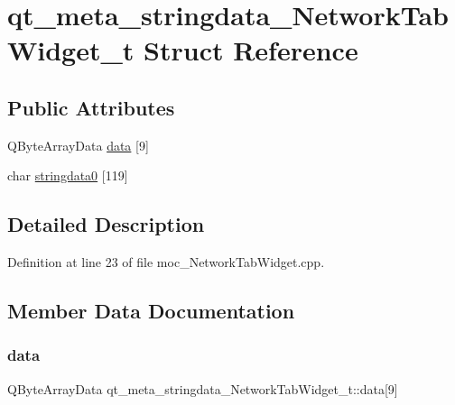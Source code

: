 \hypertarget{structqt__meta__stringdata___network_tab_widget__t}{}\section{qt\+\_\+meta\+\_\+stringdata\+\_\+\+Network\+Tab\+Widget\+\_\+t Struct Reference}
\label{structqt__meta__stringdata___network_tab_widget__t}
\subsection*{Public Attributes}
\begin{DoxyCompactItemize}
\item 
Q\+Byte\+Array\+Data \hyperlink{structqt__meta__stringdata___network_tab_widget__t_a8513bc8ccf3fb82a76d6f3df33890522}{data} \mbox{[}9\mbox{]}
\item 
char \hyperlink{structqt__meta__stringdata___network_tab_widget__t_ad52a0d68cf09ba5542b2a875b0b138eb}{stringdata0} \mbox{[}119\mbox{]}
\end{DoxyCompactItemize}


\subsection{Detailed Description}


Definition at line 23 of file moc\+\_\+\+Network\+Tab\+Widget.\+cpp.



\subsection{Member Data Documentation}
\mbox{\label{structqt__meta__stringdata___network_tab_widget__t_a8513bc8ccf3fb82a76d6f3df33890522}} 
\subsubsection{\texorpdfstring{data}{data}}
{\footnotesize\ttfamily Q\+Byte\+Array\+Data qt\+\_\+meta\+\_\+stringdata\+\_\+\+Network\+Tab\+Widget\+\_\+t\+::data\mbox{[}9\mbox{]}}



